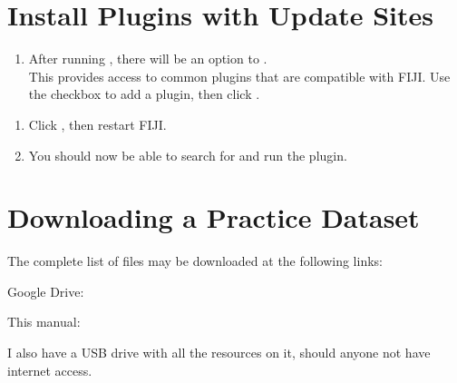 \documentclass[letterpaper,10pt,english]{jupyterBook}
\begin{document}
\section{Install Plugins with Update Sites}
\label{\detokenize{installation:install-plugins-with-update-sites}}\begin{enumerate}
%
\item {} 
\sphinxAtStartPar
After running , there will be an option to .\\
This provides access to common plugins that are compatible with FIJI. Use the checkbox to add a plugin, then click .

\end{enumerate}

\sphinxAtStartPar
{}
\begin{enumerate}
%
\setcounter{enumi}{1}
\item {} 
\sphinxAtStartPar
Click , then restart FIJI.

\item {} 
\sphinxAtStartPar
You should now be able to search for and run the plugin.

\end{enumerate}


\section{Downloading a Practice Dataset}
\label{\detokenize{installation:downloading-a-practice-dataset}}
\sphinxAtStartPar
The complete list of files may be downloaded at the following links:

\sphinxAtStartPar
Google Drive:

\sphinxAtStartPar
This manual: 

\sphinxAtStartPar
I also have a USB drive with all the resources on it, should anyone not have internet access.
\end{document}
